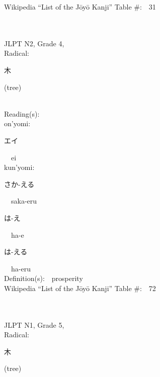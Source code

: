 \begin{multicols}{2}
Wikipedia ``List of the J\=oy\=o Kanji'' Table \#:\ \ 31 \\
\ \ \\
{\fontsize{34pt}{40pt}  }\ \ \\  %
{JLPT N2, Grade 4, \\Radical:\ \ {\begin{CJK}{UTF8}{min} 木 \end{CJK}} (tree) } \\
Reading(s):\ \ \\
{\hspace*{1em}}on'yomi:\ \ \\
{\hspace*{2em}}{\begin{CJK}{UTF8}{min} エイ \end{CJK}}\ \ ei\ \ \\
{\hspace*{1em}}kun'yomi:\ \ \\
{\hspace*{2em}}{\begin{CJK}{UTF8}{min} さか-える \end{CJK}}\ \ saka-eru\ \ \\
{\hspace*{2em}}{\begin{CJK}{UTF8}{min} は-え \end{CJK}}\ \ ha-e\ \ \\
{\hspace*{2em}}{\begin{CJK}{UTF8}{min} は-える \end{CJK}}\ \ ha-eru\ \ \\
Definition(s):\ \ prosperity \\
Wikipedia ``List of the J\=oy\=o Kanji'' Table \#:\ \ 72 \\
\ \ \\
{\fontsize{34pt}{40pt}  }\ \ \\  %
{JLPT N1, Grade 5, \\Radical:\ \ {\begin{CJK}{UTF8}{min} 木 \end{CJK}} (tree) } \\

\end{multicols}
